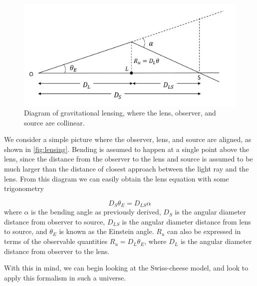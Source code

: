 \begin{figure}
  \centering
  \includegraphics[height=0.4\linewidth]{images/lensing_cropped.pdf}
  \caption{Diagram of gravitational lensing, where the lens, observer, and source are collinear.}
  \label{fig:lensing}
\end{figure}

We consider a simple picture where the observer, lens, and source are aligned, as shown in \autoref{fig:lensing}. Bending is assumed to happen at a single point above the lens, since the distance from the observer to the lens and source is assumed to be much larger than the distance of closest approach between the light ray and the lens. From this diagram we can easily obtain the lens equation \citep{schneider1992gravitationallenses} with some trigonometry

\begin{equation}
  D_S \theta_E = D_{LS} \alpha
  \label{eq:lens-eqn}
\end{equation}
where $\alpha$ is the bending angle as previously derived, $D_S$ is the angular diameter distance from observer to source, $D_{LS}$ is the angular diameter distance from lens to source, and $\theta_E$ is known as the Einstein angle. $R_u$ can also be expressed in terms of the observable quantities $R_u = D_L \theta_E$, where $D_L$ is the angular diameter distance from observer to the lens.  

With this in mind, we can begin looking at the Swiss-cheese model, and look to apply this formalism in such a universe. 